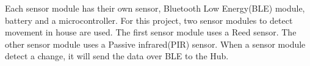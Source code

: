 Each sensor module has their own sensor, Bluetooth Low Energy(BLE) module, battery and a microcontroller. For this project, two sensor modules to detect movement in house are used. The first sensor module uses a Reed sensor. The other sensor module uses a Passive infrared(PIR) sensor. 
When a sensor module detect a change, it will send the data over BLE to the Hub.


